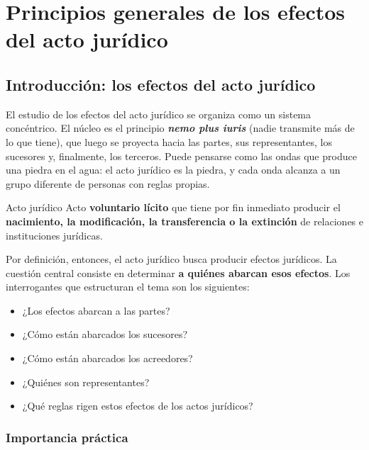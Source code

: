 \documentclass[12pt,oneside]{book}
\begin{document}

\chapter[Principios generales]{Principios generales de los efectos del acto jurídico}

\section{Introducción: los efectos del acto jurídico}

El estudio de los efectos del acto jurídico se organiza como un sistema concéntrico. El núcleo es el principio \textbf{\textit{nemo plus iuris}} (nadie transmite más de lo que tiene), que luego se proyecta hacia las partes, sus representantes, los sucesores y, finalmente, los terceros. Puede pensarse como las ondas que produce una piedra en el agua: el acto jurídico es la piedra, y cada onda alcanza a un grupo diferente de personas con reglas propias.

\begin{definition}{Acto jurídico}
Acto \textbf{voluntario lícito} que tiene por fin inmediato producir el \textbf{nacimiento, la modificación, la transferencia o la extinción} de relaciones e instituciones jurídicas.
\end{definition}

Por definición, entonces, el acto jurídico busca producir efectos jurídicos. La cuestión central consiste en determinar \textbf{a quiénes abarcan esos efectos}. Los interrogantes que estructuran el tema son los siguientes:

\begin{itemize}
    \item ¿Los efectos abarcan a las partes?
    \item ¿Cómo están abarcados los sucesores?
    \item ¿Cómo están abarcados los acreedores?
    \item ¿Quiénes son representantes?
    \item ¿Qué reglas rigen estos efectos de los actos jurídicos?
\end{itemize}

\subsection{Importancia práctica}
\end{document}
